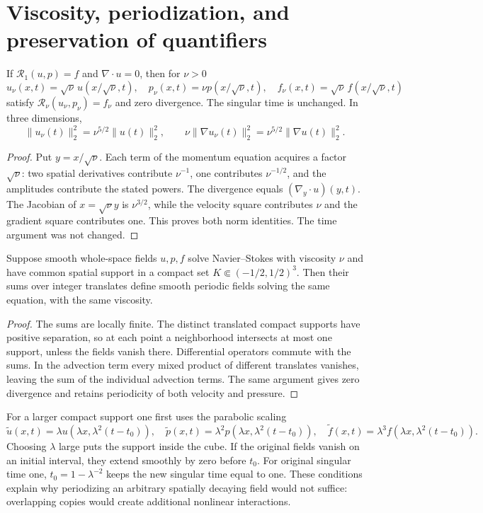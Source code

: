\section{Viscosity, periodization, and preservation of quantifiers}

\begin{proposition}
\label{prop:ns-viscosity-conversion}
If $\mathcal R_1(u,p)=f$ and $\nabla\cdot u=0$, then for $\nu>0$
\[
 u_\nu(x,t)=\sqrt\nu\,u(x/\sqrt\nu,t),\quad
 p_\nu(x,t)=\nu p(x/\sqrt\nu,t),\quad
 f_\nu(x,t)=\sqrt\nu\,f(x/\sqrt\nu,t)
\]
satisfy $\mathcal R_\nu(u_\nu,p_\nu)=f_\nu$ and zero divergence.
The singular time is unchanged. In three dimensions,
\[
 \|u_\nu(t)\|_2^2=\nu^{5/2}\|u(t)\|_2^2,
 \qquad
 \nu\|\nabla u_\nu(t)\|_2^2=\nu^{5/2}\|\nabla u(t)\|_2^2.
\]
\end{proposition}
\begin{proof}
Put $y=x/\sqrt\nu$. Each term of the momentum equation acquires a
factor $\sqrt\nu$: two spatial derivatives contribute $\nu^{-1}$,
one contributes $\nu^{-1/2}$, and the amplitudes contribute the stated
powers. The divergence equals $(\nabla_y\cdot u)(y,t)$. The Jacobian
of $x=\sqrt\nu y$ is $\nu^{3/2}$, while the velocity square contributes
$\nu$ and the gradient square contributes one. This proves both norm
identities. The time argument was not changed.
\end{proof}

\begin{proposition}
\label{prop:ns-periodization}
Suppose smooth whole-space fields $u,p,f$ solve Navier--Stokes with
viscosity $\nu$ and have common spatial support in a compact set
$K\Subset(-1/2,1/2)^3$. Then their sums over integer translates define
smooth periodic fields solving the same equation, with the same viscosity.
\end{proposition}
\begin{proof}
The sums are locally finite. The distinct translated compact supports have
positive separation, so at each point a neighborhood intersects at most
one support, unless the fields vanish there. Differential operators
commute with the sums. In the advection term every mixed product of
different translates vanishes, leaving the sum of the individual
advection terms. The same argument gives zero divergence and retains
periodicity of both velocity and pressure.
\end{proof}

For a larger compact support one first uses the parabolic scaling
\[
 \widetilde u(x,t)=\lambda u(\lambda x,\lambda^2(t-t_0)),\quad
 \widetilde p(x,t)=\lambda^2p(\lambda x,\lambda^2(t-t_0)),\quad
 \widetilde f(x,t)=\lambda^3f(\lambda x,\lambda^2(t-t_0)).
\]
Choosing $\lambda$ large puts the support inside the cube. If the original
fields vanish on an initial interval, they extend smoothly by zero before
$t_0$. For original singular time one, $t_0=1-\lambda^{-2}$ keeps the
new singular time equal to one. These conditions explain why periodizing
an arbitrary spatially decaying field would not suffice: overlapping copies
would create additional nonlinear interactions.

